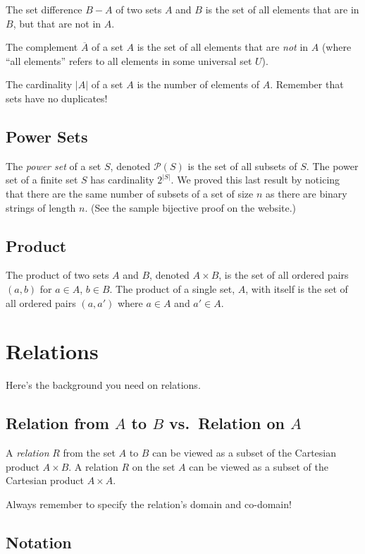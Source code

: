 \documentclass[12pt,letterpaper]{article}
\begin{document}
    The set difference $B - A$ of two sets $A$ and $B$ is the set of all elements that are in $B$, but that are not in $A$.
    
    The complement $\overline{A}$ of a set $A$ is the set of all elements that are \emph{not} in $A$ (where ``all elements'' refers to all elements in some universal set $U$).
    
    The cardinality $|A|$ of a set $A$ is the number of elements of $A$. Remember that sets have no duplicates!
    
    \subsection{Power Sets}
    The \textit{power set} of a set $S$, denoted $\mathcal{P}(S)$ is the set of all subsets of $S$. The power set of a finite set $S$ has cardinality $2^{|S|}$. We proved this last result by noticing that there are the same number of subsets of a set of size $n$ as there are binary strings of length $n$. (See the sample bijective proof on the website.)
        
    \subsection{Product}
    The product of two sets $A$ and $B$, denoted $A \times B$, is the set of all ordered pairs $(a,b)$ for $a \in A$, $b \in B$. The product of a single set, $A$, with itself is the set of all ordered pairs $(a,a')$ where $a \in A$ and $a'\in A$.

\section{Relations}

Here's the background you need on relations.

    \subsection{Relation from $A$ to $B$ vs.\ Relation on $A$}
    
    A \textit{relation} $R$ from the set $A$ to $B$ can be viewed as a subset of the Cartesian product $A \times B$. A relation $R$ on the set $A$ can be viewed as a subset of the Cartesian product $A \times A$. 
    
    Always remember to specify the relation's domain and co-domain!
    
    \subsection{Notation}
    
\end{document}
